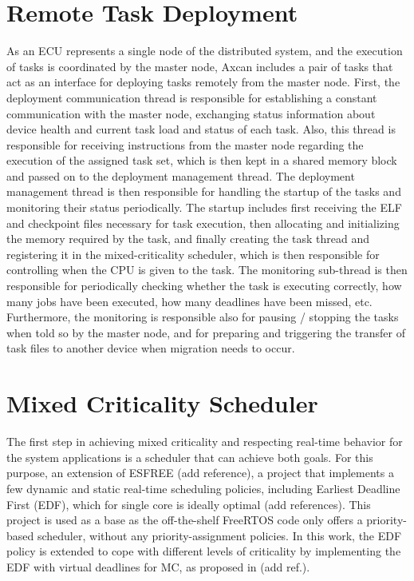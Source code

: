 \section{Remote Task Deployment}
As an ECU represents a single node of the distributed system, and the execution of tasks is coordinated by the master node, Axcan includes a pair of tasks that act as an interface for deploying tasks remotely from the master node. First, the deployment communication thread is responsible for establishing a constant communication with the master node, exchanging status information about device health and current task load and status of each task. Also, this thread is responsible for receiving instructions from the master node regarding the execution of the assigned task set, which is then kept in a shared memory block and passed on to the deployment management thread. The deployment management thread is then responsible for handling the startup of the tasks and monitoring their status periodically. The startup includes first receiving the ELF and checkpoint files necessary for task execution, then allocating and initializing the memory required by the task, and finally creating the task thread and registering it in the mixed-criticality scheduler, which is then responsible for controlling when the CPU is given to the task. The monitoring sub-thread is then responsible for periodically checking whether the task is executing correctly, how many jobs have been executed, how many deadlines have been missed, etc. Furthermore, the monitoring is responsible also for pausing / stopping the tasks when told so by the master node, and for preparing and triggering the transfer of task files to another device when migration needs to occur.

\section{Mixed Criticality Scheduler}

The first step in achieving mixed criticality and respecting real-time behavior for the system applications is a scheduler that can achieve both goals. For this purpose, an extension of ESFREE (add reference), a project that implements a few dynamic and static real-time scheduling policies, including Earliest Deadline First (EDF), which for single core is ideally optimal (add references). This project is used as a base as the off-the-shelf FreeRTOS code only offers a priority-based scheduler, without any priority-assignment policies. In this work, the EDF policy is extended to cope with different levels of criticality by implementing the EDF with virtual deadlines for MC, as proposed in (add ref.).

